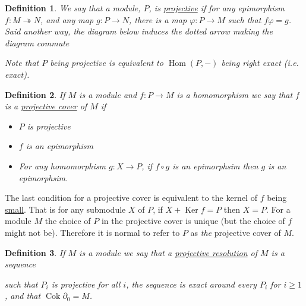 \documentclass[11pt, a4paper, english]{article}
\numberwithin{prop}{section}
\numberwithin{lemma}{section}
\numberwithin{theorem}{section}
\newtheorem{defin}{Definition}
\numberwithin{defin}{section}
\numberwithin{example}{section}
\DeclareMathOperator{\Hom}{Hom}
\DeclareMathOperator{\Ker}{Ker}
\DeclareMathOperator{\Cok}{Cok}
\begin{document}
\begin{appendices}
\begin{defin}
\label{def:projective}
We say that a module, $P$, is \underline{projective} if for any epimorphism $f: M \twoheadrightarrow N$, and any map $g: P \to N$, there is a map $\varphi: P \to M$ such that $f \varphi = g$. Said another way, the diagram below induces the dotted arrow making the diagram commute
\begin{center}
\end{center} 
Note that $P$ being projective is equivalent to $\Hom(P, -)$ being right exact (i.e. exact).
\end{defin}

\begin{defin}
\label{def:projective_cover}
If $M$ is a module and $f: P \to M$ is a homomorphism we say that $f$ is a \underline{projective cover} of $M$ if
\begin{itemize}
\item $P$ is projective
\item $f$ is an epimorphism
\item For any homomorphism $g: X \to P$, if $f \circ g$ is an epimorphsim then $g$ is an epimorphsim.
\end{itemize}
\end{defin}
The last condition for a projective cover is equivalent to the kernel of $f$ being \underline{small}. That is for any submodule $X$ of $P$, if $X + \Ker f = P$ then $X=P$. For a module $M$ the choice of $P$ in the projective cover is unique (but the choice of $f$ might not be). Therefore it is normal to refer to $P$ as \textit{the} projective cover of $M$. 


\begin{defin}
\label{def:projective_resolution}
If $M$ is a module we say that a \underline{projective resolution} of $M$ is a sequence
\begin{center}
\end{center}
such that $P_i$ is projective for all $i$, the sequence is exact around every $P_i$ for $i \geq 1$, and that $\Cok \partial_0 = M$.


\end{defin}
\end{appendices}
\end{document}
